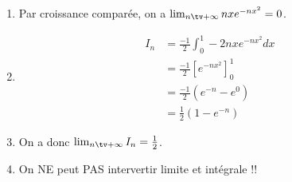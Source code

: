 \begin{correction}
\begin{enumerate}
\item Par croissance comparée, on a $\lim_{n\tv+\infty} nxe^{-nx^2}=0$.
\item \begin{align*}
I_n&=\frac{-1}{2}\int_0^1 -2nxe^{-nx^2}dx\\
	&=\frac{-1}{2}[e^{-nx^2}]_0^1 \\
	&=\frac{-1}{2}(e^{-n} -e^{0}) \\
		&=\frac{1}{2}(1-e^{-n}) 
\end{align*}
\item On  a donc $\lim_{n\tv+\infty} I_n=\frac{1}{2}$. 
\item On NE peut PAS intervertir limite et intégrale !!
\end{enumerate}
\end{correction}









